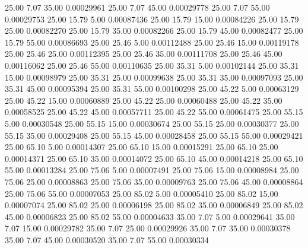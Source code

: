      25.00      7.07     35.00     0.00029961
     25.00      7.07     45.00     0.00029778
     25.00      7.07     55.00     0.00029753
     25.00     15.79      5.00     0.00087436
     25.00     15.79     15.00     0.00084226
     25.00     15.79     25.00     0.00082270
     25.00     15.79     35.00     0.00082266
     25.00     15.79     45.00     0.00082477
     25.00     15.79     55.00     0.00086693
     25.00     25.46      5.00     0.00112488
     25.00     25.46     15.00     0.00119178
     25.00     25.46     25.00     0.00112395
     25.00     25.46     35.00     0.00111708
     25.00     25.46     45.00     0.00116062
     25.00     25.46     55.00     0.00110635
     25.00     35.31      5.00     0.00102144
     25.00     35.31     15.00     0.00098979
     25.00     35.31     25.00     0.00099638
     25.00     35.31     35.00     0.00097093
     25.00     35.31     45.00     0.00095394
     25.00     35.31     55.00     0.00100298
     25.00     45.22      5.00     0.00063129
     25.00     45.22     15.00     0.00060889
     25.00     45.22     25.00     0.00060488
     25.00     45.22     35.00     0.00058525
     25.00     45.22     45.00     0.00057711
     25.00     45.22     55.00     0.00061475
     25.00     55.15      5.00     0.00030548
     25.00     55.15     15.00     0.00030674
     25.00     55.15     25.00     0.00030377
     25.00     55.15     35.00     0.00029408
     25.00     55.15     45.00     0.00028458
     25.00     55.15     55.00     0.00029421
     25.00     65.10      5.00     0.00014307
     25.00     65.10     15.00     0.00015291
     25.00     65.10     25.00     0.00014371
     25.00     65.10     35.00     0.00014072
     25.00     65.10     45.00     0.00014218
     25.00     65.10     55.00     0.00013284
     25.00     75.06      5.00     0.00007491
     25.00     75.06     15.00     0.00008984
     25.00     75.06     25.00     0.00008863
     25.00     75.06     35.00     0.00009763
     25.00     75.06     45.00     0.00008864
     25.00     75.06     55.00     0.00007053
     25.00     85.02      5.00     0.00005410
     25.00     85.02     15.00     0.00007074
     25.00     85.02     25.00     0.00006198
     25.00     85.02     35.00     0.00006849
     25.00     85.02     45.00     0.00006823
     25.00     85.02     55.00     0.00004633
     35.00      7.07      5.00     0.00029641
     35.00      7.07     15.00     0.00029782
     35.00      7.07     25.00     0.00029926
     35.00      7.07     35.00     0.00030378
     35.00      7.07     45.00     0.00030520
     35.00      7.07     55.00     0.00030334
